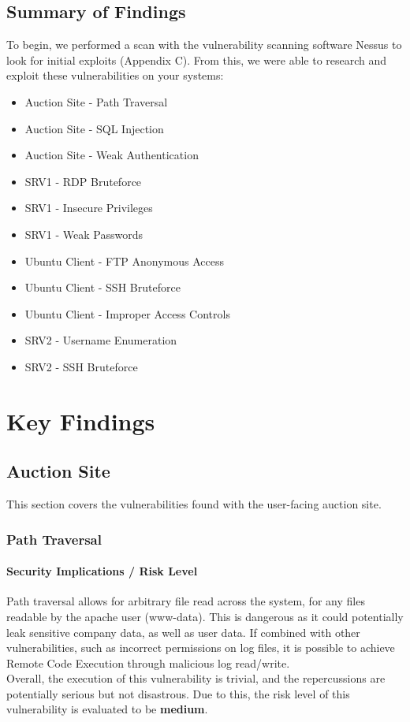 \documentclass{report}
\begin{document}
\section{Summary of Findings}
To begin, we performed a scan with the vulnerability scanning software Nessus to look for initial exploits (Appendix C). From this, we were able to research and exploit these vulnerabilities on your systems:
\begin{itemize}
	\item Auction Site - Path Traversal
	\item Auction Site - SQL Injection
	\item Auction Site - Weak Authentication
	\item SRV1 - RDP Bruteforce
	\item SRV1 - Insecure Privileges
	\item SRV1 - Weak Passwords
	\item Ubuntu Client - FTP Anonymous Access
	\item Ubuntu Client - SSH Bruteforce
	\item Ubuntu Client - Improper Access Controls
	\item SRV2 - Username Enumeration
	\item SRV2 - SSH Bruteforce
\end{itemize}


\chapter{Key Findings}
\section{Auction Site}
This section covers the vulnerabilities found with the user-facing auction site.
\subsection{Path Traversal}
\subsubsection{Security Implications / Risk Level}
Path traversal allows for arbitrary file read across the system, for any files readable by the apache user (www-data). This is dangerous as it could potentially leak sensitive company data, as well as user data. If combined with other vulnerabilities, such as incorrect permissions on log files, it is possible to achieve Remote Code Execution through malicious log read/write.\\
Overall, the execution of this vulnerability is trivial, and the repercussions are potentially serious but not disastrous. Due to this, the risk level of this vulnerability is evaluated to be \textbf{medium}.
\end{document}
